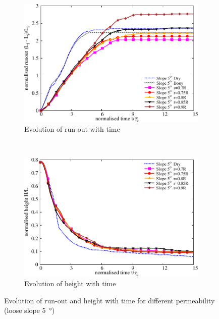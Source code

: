 \begin{figure}
\centering
\begin{subfigure}[b]{0.95\textwidth}
\centering
\includegraphics[width=0.95\columnwidth]{Runout_loose_5_slope}
\caption{Evolution of run-out with time}
\label{fig:run5}
\end{subfigure}\\
\begin{subfigure}[b]{0.95\textwidth}
\centering
\includegraphics[width=0.95\columnwidth]{Height_loose_5_slope}
\caption{Evolution of height with time}
\label{fig:height5}
\end{subfigure}
\caption{Evolution of run-out and height with time for different permeability 
(loose slope \SI{5}{\degree})}
\label{fig:height_run_5}
\end{figure}

